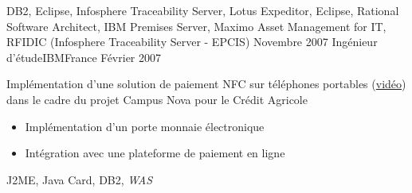 \begin{experiences}
{\begin{itemize}
                      \end{itemize}
                    }
                    {
                      DB2, Eclipse, Infosphere Traceability Server, Lotus Expeditor, Eclipse, 
                      Rational Software Architect, IBM Premises Server, Maximo Asset Management for IT, RFIDIC (Infosphere Traceability Server - EPCIS)
                    }
  \emptySeparator
  \experience
  {Novembre 2007}  {Ingénieur d'étude}{IBM}{France}
  {Février 2007}   {
                      Implémentation d'une solution de paiement NFC sur téléphones portables (\href{http://www.nouvo.ch/s-007}{vidéo}) 
                      dans le cadre du projet Campus Nova pour le Crédit Agricole  
                      \begin{itemize}
                        \item Implémentation d'un porte monnaie électronique                                            
                        \item Intégration avec une plateforme de paiement en ligne  
                      \end{itemize}
                  }
                  {J2ME, Java Card, DB2, \emph{WAS}}  
\end{experiences}
